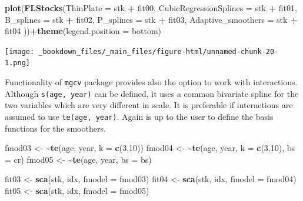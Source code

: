 \documentclass[
]{book}
\newenvironment{Shaded}{\begin{snugshade}}{\end{snugshade}}
\newcommand{\AttributeTok}[1]{\textcolor[rgb]{0.13,0.29,0.53}{#1}}
\newcommand{\DecValTok}[1]{\textcolor[rgb]{0.00,0.00,0.81}{#1}}
\newcommand{\ErrorTok}[1]{\textcolor[rgb]{0.64,0.00,0.00}{\textbf{#1}}}
\newcommand{\FunctionTok}[1]{\textcolor[rgb]{0.13,0.29,0.53}{\textbf{#1}}}
\newcommand{\NormalTok}[1]{#1}
\newcommand{\OtherTok}[1]{\textcolor[rgb]{0.56,0.35,0.01}{#1}}
\newcommand{\SpecialCharTok}[1]{\textcolor[rgb]{0.81,0.36,0.00}{\textbf{#1}}}
\newcommand{\StringTok}[1]{\textcolor[rgb]{0.31,0.60,0.02}{#1}}
\begin{document}
\begin{Shaded}
\begin{Highlighting}[]
\FunctionTok{plot}\NormalTok{(}\FunctionTok{FLStocks}\NormalTok{(}\AttributeTok{ThinPlate =}\NormalTok{ stk }\SpecialCharTok{+}\NormalTok{ fit00,}
              \AttributeTok{CubicRegressionSplines =}\NormalTok{ stk }\SpecialCharTok{+}\NormalTok{ fit01,}
              \AttributeTok{B\_splines =}\NormalTok{ stk }\SpecialCharTok{+}\NormalTok{ fit02,}
              \AttributeTok{P\_splines =}\NormalTok{ stk }\SpecialCharTok{+}\NormalTok{ fit03,}
              \AttributeTok{Adaptive\_smoothers =}\NormalTok{ stk }\SpecialCharTok{+}\NormalTok{ fit04}
\NormalTok{              ))}\SpecialCharTok{+}\FunctionTok{theme}\NormalTok{(}\AttributeTok{legend.position =} \StringTok{\textquotesingle{}bottom\textquotesingle{}}\NormalTok{)}
\end{Highlighting}
\end{Shaded}

\texttt{[image: \_bookdown\_files/\_main\_files/figure-html/unnamed-chunk-20-1.png]}

Functionality of \texttt{mgcv} package provides also the option to work with interactions. Although \texttt{s(age,\ year)} can be defined, it uses a common bivariate spline for the two variables which are very different in scale. It is preferable if interactions are assumed to use \texttt{te(age,\ year)}. Again is up to the user to define the basis functions for the smoothers.

\begin{Shaded}
\begin{Highlighting}[]
\NormalTok{fmod03 }\OtherTok{\textless{}{-}} \ErrorTok{\textasciitilde{}}\FunctionTok{te}\NormalTok{(age, year, }\AttributeTok{k =} \FunctionTok{c}\NormalTok{(}\DecValTok{3}\NormalTok{,}\DecValTok{10}\NormalTok{))}
\NormalTok{fmod04 }\OtherTok{\textless{}{-}} \ErrorTok{\textasciitilde{}}\FunctionTok{te}\NormalTok{(age, year, }\AttributeTok{k =} \FunctionTok{c}\NormalTok{(}\DecValTok{3}\NormalTok{,}\DecValTok{10}\NormalTok{), }\AttributeTok{bs =} \StringTok{\textquotesingle{}cr\textquotesingle{}}\NormalTok{)}
\NormalTok{fmod05 }\OtherTok{\textless{}{-}} \ErrorTok{\textasciitilde{}}\FunctionTok{te}\NormalTok{(age, year, }\AttributeTok{bs =} \StringTok{\textquotesingle{}bs\textquotesingle{}}\NormalTok{)}

\NormalTok{fit03 }\OtherTok{\textless{}{-}} \FunctionTok{sca}\NormalTok{(stk, idx, }\AttributeTok{fmodel =}\NormalTok{ fmod03)}
\NormalTok{fit04 }\OtherTok{\textless{}{-}} \FunctionTok{sca}\NormalTok{(stk, idx, }\AttributeTok{fmodel =}\NormalTok{ fmod04)}
\NormalTok{fit05 }\OtherTok{\textless{}{-}} \FunctionTok{sca}\NormalTok{(stk, idx, }\AttributeTok{fmodel =}\NormalTok{ fmod05)}
\end{Highlighting}
\end{Shaded}
\end{document}
